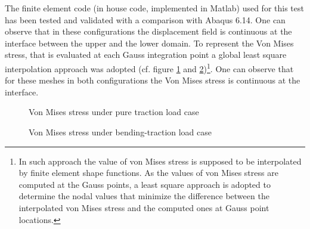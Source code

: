     The finite element code (in house code, implemented in Matlab) used for this test has been tested and validated with a comparison with Abaqus 6.14.
    One can observe that in these configurations the displacement field is continuous at the interface between the upper and the lower domain. 
    To represent the Von Mises stress, that is evaluated at each Gauss integration point a global least square interpolation approach \cite{hinton1974local} was adopted  (cf. figure \ref{fig.17} and \ref{fig.18})\footnote{In such approach the value of von Mises stress is supposed to be interpolated by finite element shape functions. As the values of von Mises stress are computed at the Gauss points, a least square approach is adopted to determine the nodal values that minimize the difference between the interpolated von Mises stress and the computed ones at Gauss point locations.}. One can observe that for these meshes in both configurations the Von Mises stress is continuous at the interface. 
 \newpage
    \begin{figure}[!ht]
    \centering
      \caption{Von Mises stress under pure traction load case}
      \label{fig.17}
    \end{figure}
    \begin{figure}[!ht]
    \centering
      \caption{Von Mises stress under bending-traction load case }
      \label{fig.18}
    \end{figure}
 \newpage
